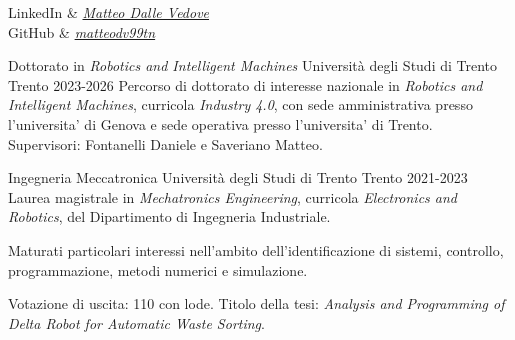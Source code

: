 \documentclass[10pt,a4paper]{report}
\newif\ifcomplete
\begin{document}
    \def\name{Matteo}
    \def\surname{Dalle Vedove}
    \makeatletter
    \begin{topheader}
        \ifcomplete e-mail & matteodv99tn@gmail.com \\ \fi
        \ifcomplete indirizzo & via San Biagio, n. 14, Borghetto all'Adige (TN), CAP 38063, Italia \\ \fi
        \ifcomplete telefono & (+39) 349 843 9679 \\ \fi
        \ifcomplete nascita & 12 maggio 1999, Rovereto \\ \fi
        \ifcomplete nazionalità & italiana \\ \fi
        \ifcomplete codice fiscale & DLLMTT99E12H612K \\ \fi
        LinkedIn & \href{https://www.linkedin.com/in/matteo-dalle-vedove-71a290239/}{\textit{Matteo Dalle Vedove}} \\
        GitHub & \href{https://github.com/matteodv99tn}{\textit{matteodv99tn}} \\
    \end{topheader}


    \begin{study}
        {Dottorato in \textit{Robotics and Intelligent Machines}}
        {Università degli Studi di Trento}
        {Trento}
        {2023-2026}
        Percorso di dottorato di interesse nazionale in \textit{Robotics and Intelligent Machines}, curricola \textit{Industry 4.0}, con sede amministrativa presso l'universita' di Genova e sede operativa presso l'universita' di Trento. \\
        Supervisori: Fontanelli Daniele e Saveriano Matteo.
    \end{study}

    \begin{study}
        {Ingegneria Meccatronica}
        {Università degli Studi di Trento}
        {Trento}
        {2021-2023}
        Laurea magistrale in \textit{Mechatronics Engineering}, curricola \textit{Electronics and Robotics}, del Dipartimento di Ingegneria Industriale.

        Maturati particolari interessi nell'ambito dell'identificazione di sistemi, controllo, programmazione, metodi numerici e simulazione.

        Votazione di uscita: 110 con lode. Titolo della tesi: \textit{Analysis and Programming of Delta Robot for Automatic Waste Sorting}.
    \end{study}
\end{document}
